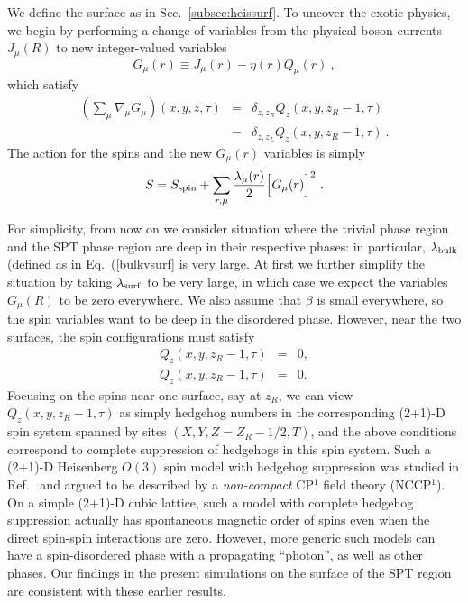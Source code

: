 \documentclass[prb,twocolumn]{revtex4-1}
\begin{document}
We define the surface as in Sec.~\ref{subsec:heissurf}. To uncover the exotic physics, we begin by performing a change of variables from the physical boson currents $J_\mu(R)$ to new integer-valued variables
\begin{equation}
G_\mu(r) \equiv J_\mu(r) - \eta(r) Q_\mu(r) ~,
\end{equation}
which satisfy 
\begin{eqnarray*}
\left(\sum_\mu \nabla_\mu G_\mu\right) (x, y, z, \tau) &=& 
\delta_{z, z_R} Q_z(x, y, z_R-1, \tau) \\
&-& \delta_{z, z_L} Q_z(x, y, z_R-1, \tau) ~. 
\end{eqnarray*}
The action for the spins and the new $G_\mu(r)$ variables is simply
\begin{equation}
S = S_{\rm spin} + \sum_{r,\mu} \frac{\lambda_\mu(r)}{2} \Big[G_\mu(r)\Big]^2 ~.
\end{equation}

For simplicity, from now on we consider situation where the trivial phase region and the SPT phase region are deep in their respective phases: in particular, $\lambda_{\rm bulk}$ (defined as in Eq.~(\ref{bulkvsurf} is very large.  At first we further simplify the situation by taking $\lambda_{\rm surf}$ to be very large, in which case we expect the variables $G_\mu(R)$ to be zero everywhere.  We also assume that $\beta$ is small everywhere, so the spin variables want to be deep in the disordered phase.  However, near the two surfaces, the spin configurations must satisfy
\begin{eqnarray}
Q_z(x, y, z_R-1, \tau) &=& 0, \\
Q_z(x, y, z_R-1, \tau) &=& 0.
\end{eqnarray}
Focusing on the spins near one surface, say at $z_R$, we can view $Q_z(x, y, z_R-1, \tau)$ as simply hedgehog numbers in the corresponding (2+1)-D spin system spanned by sites $(X, Y, Z=Z_R-1/2, T)$, and the above conditions correspond to complete suppression of hedgehogs in this spin system.  Such a (2+1)-D Heisenberg $O(3)$ spin model with hedgehog suppression was studied in Ref.~ and argued to be described by a \emph{non-compact} CP$^1$ field theory (NCCP$^1$).  On a simple (2+1)-D cubic lattice, such a model with complete hedgehog suppression actually has spontaneous magnetic order of spins even when the direct spin-spin interactions are zero.\cite{LauDasgupta, KamalMurthy}  However, more generic such models can have a spin-disordered phase with a propagating ``photon''\cite{KamalMurthy, LesikAshvin}, as well as other phases\cite{LesikAshvin2}.  Our findings in the present simulations on the surface of the SPT region are consistent with these earlier results.
\end{document}
